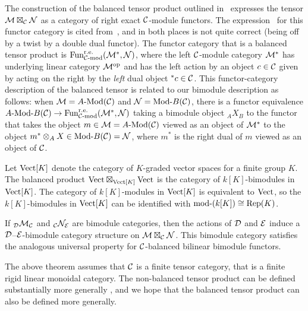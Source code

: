 \documentclass{amsart}
\begin{document}
\begin{remark}
The construction of the balanced tensor product outlined in~\cite{MR3107567} expresses the tensor $\mathcal M \boxtimes_{\mathcal C} \mathcal N$ as a category of right exact $\mathcal C$-module functors.  The expression~\cite[Eq~13]{MR3107567} for this functor category is cited from~\cite{0909.3140}, and in both places is not quite correct (being off by a twist by a double dual functor).  The functor category that is a balanced tensor product is $\mathrm{Fun}_{\mathcal C\textrm{-}\mathrm{mod}}^{\mathrm{r.e.}}(\mathcal M^{\ast},\mathcal N)$, where the left $\mathcal C$-module category $\mathcal M^{\ast}$ has underlying linear category $\mathcal M^{\mathrm{op}}$ and has the left action by an object $c \in \mathcal C$ given by acting on the right by the \emph{left} dual object ${}^{\ast} c \in \mathcal C$.  This functor-category description of the balanced tensor is related to our bimodule description as follows: when $\cM = \Mod{A}{}(\cC)$ and $\cN = \Mod{}{B}(\cC)$, there is a functor equivalence $\Mod{A}{B}(\cC) \ra \mathrm{Fun}_{\cC\textrm{-}\mathrm{mod}}^{\mathrm{r.e.}}(\cM^{\ast},\cN)$ taking a bimodule object ${}_A X_B$ to the functor that takes the object $m \in \cM = \Mod{A}{}(\cC)$ viewed as an object of $\mathcal M^{\ast}$ to the object $m^\ast \otimes_A X \in \Mod{}{B}(\cC) = \cN$, where $m^\ast$ is the right dual of $m$ viewed as an object of $\mathcal C$.
\end{remark}

\begin{example}
Let $\mathrm{Vect}[K]$ denote the category of $K$-graded vector spaces for a finite group $K$.  The balanced product $\mathrm{Vect} \boxtimes_{\mathrm{Vect}[K]} \mathrm{Vect}$ is the category of $k[K]$-bimodules in $\mathrm{Vect}[K]$. The category of $k[K]$-modules in $\mathrm{Vect}[K]$ is equivalent to $\mathrm{Vect}$, so the $k[K]$-bimodules in $\mathrm{Vect}[K]$ can be identified with $\text{mod-}(k[K]) \cong \mathrm{Rep}(K)$.
\end{example}

\begin{remark}
	If ${}_{\mathcal D}\mathcal M_{\mathcal C}$ and ${}_{\mathcal C}\mathcal N_{\mathcal E}$ are bimodule categories, then the actions of $\mathcal D$ and $\mathcal E$ induce a $\mathcal D$--$\mathcal E$-bimodule category structure on $\mathcal M \boxtimes_{\mathcal C} \mathcal N$. This bimodule category satisfies the analogous universal property for $\mathcal C$-balanced bilinear bimodule functors.
\end{remark}

\begin{remark}
The above theorem assumes that $\mathcal C$ is a finite tensor category, that is a finite rigid linear monoidal category.  The non-balanced tensor product can be defined substantially more generally \cite{1212.1545}, and we hope that the balanced tensor product can also be defined more generally.
\end{remark}
\end{document}
